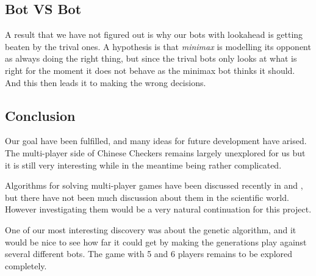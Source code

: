 
\subsection{Bot VS Bot}
A result that we have not figured out is why our bots with lookahead is
getting beaten by the trival ones. A hypothesis is that \emph{minimax} is modelling
its opponent as always doing the right thing, but since the trival bots only
looks at what is right for the moment it does not behave as the minimax
bot thinks it should. And this then leads it to making the wrong decisions.

\subsection{Conclusion}
Our goal have been fulfilled, and many ideas for future development have
arised. The multi-player side of Chinese Checkers remains largely unexplored
for us but it is still very interesting while in the meantime being rather
complicated.

Algorithms for solving multi-player games have been discussed recently in
\cite{Hashavit} and \cite{bestreplysearch}, but there have not been much
discussion about them in the scientific world. However investigating them
would be a very natural continuation for this project.

One of our most interesting discovery was about the genetic algorithm, and
it would be nice to see how far it could get by making the generations play
against several different bots. The game with 5 and 6 players remains to be
explored completely.

